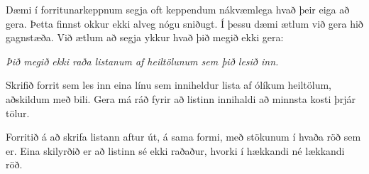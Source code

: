 \begin{problem}
	Dæmi í forritunarkeppnum segja oft keppendum nákvæmlega hvað þeir eiga að gera. Þetta finnst okkur ekki alveg nógu sniðugt. Í þessu dæmi ætlum við gera hið gagnstæða. Við ætlum að segja ykkur hvað þið megið ekki gera:

	\begin{center}
		\textit{Þið megið ekki raða listanum af heiltölunum sem þið lesið inn.}
	\end{center}

	Skrifið forrit sem les inn eina línu sem inniheldur lista af ólíkum heiltölum, aðskildum með bili. Gera má ráð fyrir að listinn innihaldi að minnsta kosti þrjár tölur.

	Forritið á að skrifa listann aftur út, á sama formi, með stökunum í hvaða röð sem er. Eina skilyrðið er að listinn sé ekki raðaður, hvorki í hækkandi né lækkandi röð.

\begin{example}
%
\end{example}
\begin{example}
%
\end{example}
\end{problem}